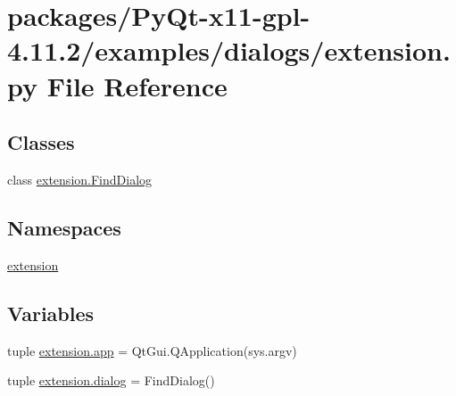 \hypertarget{PyQt-x11-gpl-4_811_82_2examples_2dialogs_2extension_8py}{}\section{packages/\+Py\+Qt-\/x11-\/gpl-\/4.11.2/examples/dialogs/extension.py File Reference}
\label{PyQt-x11-gpl-4_811_82_2examples_2dialogs_2extension_8py}
\subsection*{Classes}
\begin{DoxyCompactItemize}
\item 
class \hyperlink{classextension_1_1FindDialog}{extension.\+Find\+Dialog}
\end{DoxyCompactItemize}
\subsection*{Namespaces}
\begin{DoxyCompactItemize}
\item 
 \hyperlink{namespaceextension}{extension}
\end{DoxyCompactItemize}
\subsection*{Variables}
\begin{DoxyCompactItemize}
\item 
tuple \hyperlink{namespaceextension_a225854a99e8968fdd47b94f9892311cc}{extension.\+app} = Qt\+Gui.\+Q\+Application(sys.\+argv)
\item 
tuple \hyperlink{namespaceextension_a54743ff3b8af20ec0de6b8102969b903}{extension.\+dialog} = Find\+Dialog()
\end{DoxyCompactItemize}
